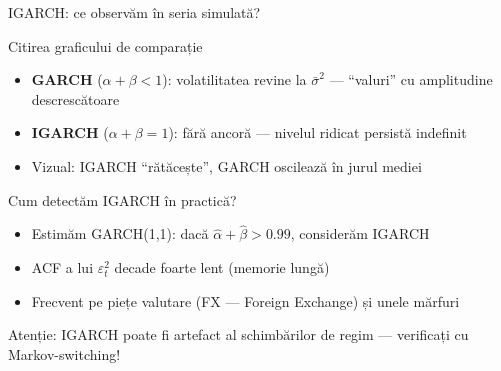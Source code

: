 \documentclass[9pt, aspectratio=169, t]{beamer}
\begin{document}
\begin{frame}{IGARCH: ce observăm în seria simulată?}
    \small
        \begin{block}{Citirea graficului de comparație}
            \begin{itemize}
                \item \textbf{GARCH} ($\alpha + \beta < 1$): volatilitatea revine la $\bar{\sigma}^2$ --- ``valuri'' cu amplitudine descrescătoare
                \item \textbf{IGARCH} ($\alpha + \beta = 1$): fără ancoră --- nivelul ridicat persistă indefinit
                \item Vizual: IGARCH ``rătăcește'', GARCH oscilează în jurul mediei
            \end{itemize}
        \end{block}
        \begin{exampleblock}{Cum detectăm IGARCH în practică?}
            \begin{itemize}
                \item Estimăm GARCH(1,1): dacă $\hat{\alpha} + \hat{\beta} > 0.99$, considerăm IGARCH
                \item ACF a lui $\varepsilon_t^2$ decade foarte lent (memorie lungă)
                \item Frecvent pe piețe valutare (FX --- Foreign Exchange) și unele mărfuri
            \end{itemize}
        \end{exampleblock}
        \begin{alertblock}{Atenție: IGARCH poate fi artefact al schimbărilor de regim --- verificați cu Markov-switching!}
        \end{alertblock}
\end{frame}
\end{document}
